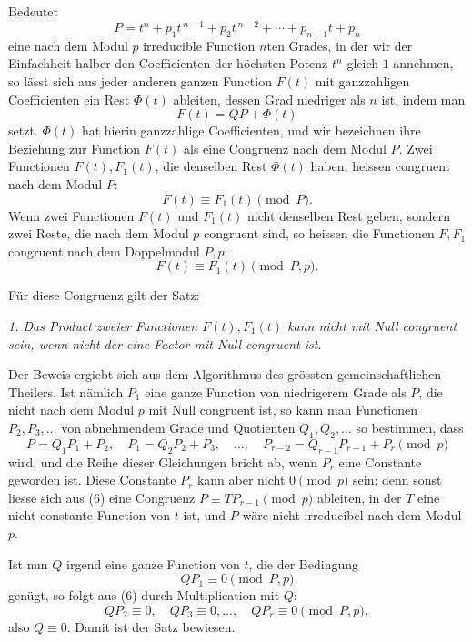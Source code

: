 \documentclass[11pt]{article}
\begin{document}
Bedeutet
\begin{equation}
 P=t^n+p_1t^{\,n-1}+p_2t^{\,n-2}+\cdots+p_{n-1}t+p_n \tag{3}
\end{equation}
eine nach dem Modul $p$ irreducible Function $n$ten Grades, in der wir der Einfachheit halber den Coefficienten der höchsten Potenz $t^n$ gleich $1$ annehmen, so lässt sich aus jeder anderen ganzen Function $F(t)$ mit ganzzahligen Coefficienten ein Rest $\Phi(t)$ ableiten, dessen Grad niedriger als $n$ ist, indem man
\begin{equation}
 F(t)=QP+\Phi(t) \tag{4}
\end{equation}
setzt. $\Phi(t)$ hat hierin ganzzahlige Coefficienten, und wir bezeichnen ihre Beziehung zur Function $F(t)$ als eine Congruenz nach dem Modul $P$. Zwei Functionen $F(t),F_1(t)$, die denselben Rest $\Phi(t)$ haben, heissen congruent nach dem Modul $P$:
\[
 F(t)\equiv F_1(t)\pmod P.
\]
Wenn zwei Functionen $F(t)$ und $F_1(t)$ nicht denselben Rest geben, sondern zwei Reste, die nach dem Modul $p$ congruent sind, so heissen die Functionen $F,F_1$ congruent nach dem Doppelmodul $P,p$:
\begin{equation}
 F(t)\equiv F_1(t)\pmod {P,p}. \tag{5}
\end{equation}

Für diese Congruenz gilt der Satz:

\emph{1. Das Product zweier Functionen $F(t),F_1(t)$ kann nicht mit Null congruent sein, wenn nicht der eine Factor mit Null congruent ist.}

Der Beweis ergiebt sich aus dem Algorithmus des grössten gemeinschaftlichen Theilers. Ist nämlich $P_1$ eine ganze Function von niedrigerem Grade als $P$, die nicht nach dem Modul $p$ mit Null congruent ist, so kann man Functionen $P_2,P_3,\ldots$ von abnehmendem Grade und Quotienten $Q_1,Q_2,\ldots$ so bestimmen, dass
\begin{equation}
 P=Q_1P_1+P_2,\quad P_1=Q_2P_2+P_3,\quad
 \ldots,\quad P_{r-2}=Q_{r-1}P_{r-1}+P_r\pmod p \tag{6}
\end{equation}
wird, und die Reihe dieser Gleichungen bricht ab, wenn $P_r$ eine Constante geworden ist. Diese Constante $P_r$ kann aber nicht $0\pmod p$ sein; denn sonst liesse sich aus (6) eine Congruenz $P\equiv TP_{r-1}\pmod p$ ableiten, in der $T$ eine nicht constante Function von $t$ ist, und $P$ wäre nicht irreducibel nach dem Modul $p$.

Ist nun $Q$ irgend eine ganze Function von $t$, die der Bedingung
\[
 QP_1\equiv0\pmod {P,p}
\]
genügt, so folgt aus (6) durch Multiplication mit $Q$:
\[
 QP_2\equiv0,\quad QP_3\equiv0,\ldots,\quad QP_r\equiv0\pmod {P,p},
\]
also $Q\equiv0$. Damit ist der Satz bewiesen.
\end{document}
